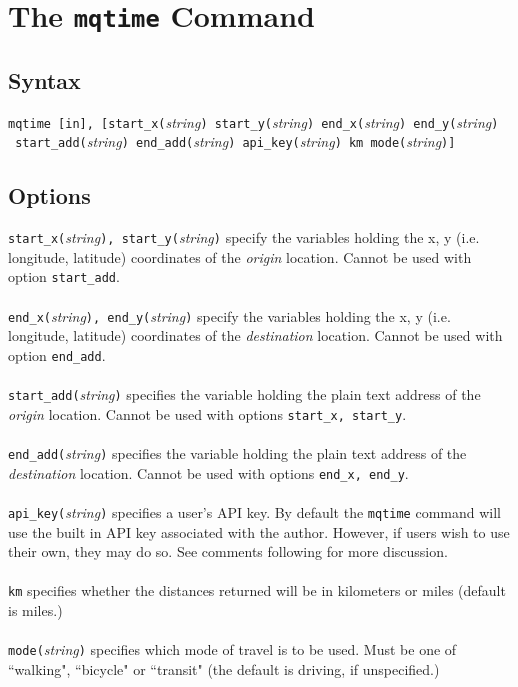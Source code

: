 \documentclass[12pt]{article}
\begin{document}
\section{The \texttt{mqtime} Command}

\subsection{Syntax}

\verb|mqtime [in], [start_x(|\textit{string}\verb|) start_y(|\textit{string}\verb|) end_x(|\textit{string}\verb|) end_y(|\textit{string}\verb|)| \\\verb| start_add(|\textit{string}\verb|) end_add(|\textit{string}\verb|) api_key(|\textit{string}\verb|) km mode(|\textit{string}\verb|)]|


\subsection{Options}
\verb|start_x(|\textit{string}\verb|), start_y(|\textit{string}\verb|)| specify the variables holding the x, y (i.e. longitude, latitude) coordinates of the \textit{origin} location. Cannot be used with option \verb|start_add|.
\\ \\
\verb|end_x(|\textit{string}\verb|), end_y(|\textit{string}\verb|)| specify the variables holding the x, y (i.e. longitude, latitude) coordinates of the \textit{destination} location. Cannot be used with option \verb|end_add|.
\\ \\
\verb|start_add(|\textit{string}\verb|)| specifies the variable holding the plain text address of the \textit{origin} location. Cannot be used with options \verb|start_x, start_y|.
\\ \\
\verb|end_add(|\textit{string}\verb|)| specifies the variable holding the plain text address of the \textit{destination} location. Cannot be used with options \verb|end_x, end_y|.
\\ \\
\verb|api_key(|\textit{string}\verb|)| specifies a user's API key. By default the \verb|mqtime| command will use the built in API key associated with the author. However, if users wish to use their own, they may do so. See comments following for more discussion.
\\ \\
\verb|km| specifies whether the distances returned will be in kilometers or miles (default is miles.)
\\ \\
\verb|mode(|\textit{string}\verb|)| specifies which mode of travel is to be used. Must be one of ``walking", ``bicycle" or ``transit" (the default is driving, if unspecified.) 
\end{document}
